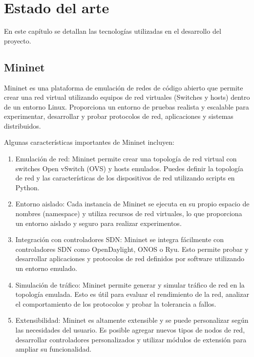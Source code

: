 \documentclass[a4paper, 12pt]{book}
\begin{document}
	
	
	\cleardoublepage
	\chapter{Estado del arte}
	\label{chap:estado}
	
	En este capítulo se detallan las tecnologías utilizadas en el desarrollo del proyecto.	
	
	\section{Mininet} 
	\label{sec:mininet}
	
	Mininet es una plataforma de emulación de redes de código abierto que permite crear una red virtual utilizando equipos de red virtuales (Switches y hosts) dentro de un entorno Linux. Proporciona un entorno de pruebas realista y escalable para experimentar, desarrollar y probar protocolos de red, aplicaciones y sistemas distribuidos.
	
	Algunas características importantes de Mininet incluyen:
	
	\begin{enumerate}
		\item 	Emulación de red: Mininet permite crear una topología de red virtual con switches Open vSwitch (OVS) y hosts emulados. Puedes definir la topología de red y las características de los dispositivos de red utilizando scripts en Python.
		\item 	Entorno aislado: Cada instancia de Mininet se ejecuta en su propio espacio de nombres (namespace) y utiliza recursos de red virtuales, lo que proporciona un entorno aislado y seguro para realizar experimentos.
		\item 	Integración con controladores SDN: Mininet se integra fácilmente con controladores SDN como OpenDaylight, ONOS o Ryu. Esto permite probar y desarrollar aplicaciones y protocolos de red definidos por software utilizando un entorno emulado.
		\item 	Simulación de tráfico: Mininet permite generar y simular tráfico de red en la topología emulada. Esto es útil para evaluar el rendimiento de la red, analizar el comportamiento de los protocolos y probar la tolerancia a fallos.
		\item   Extensibilidad: Mininet es altamente extensible y se puede personalizar según las necesidades del usuario. Es posible agregar nuevos tipos de nodos de red, desarrollar controladores personalizados y utilizar módulos de extensión para ampliar su funcionalidad.
	\end{enumerate}
\end{document}
